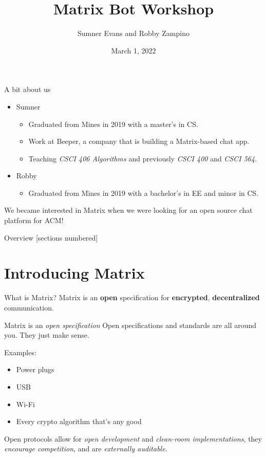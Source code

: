 \documentclass{acm}
\title{Matrix Bot Workshop}
\author{Sumner Evans and Robby Zampino}
\date{March 1, 2022}
\begin{document}
\begin{frame}{A bit about us}
    \begin{itemize}
        \item Sumner
            \begin{itemize}
                \item Graduated from Mines in 2019 with a master's in CS.
                \item Work at Beeper, a company that is building a Matrix-based
                    chat app.
                \item Teaching \textit{CSCI 406 Algorithms} and previously
                    \textit{CSCI 400} and \textit{CSCI 564}.
            \end{itemize}

        \item Robby
            \begin{itemize}
                \item Graduated from Mines in 2019 with a bachelor's in EE and
                    minor in CS.
            \end{itemize}
    \end{itemize}

    We became interested in Matrix when we were looking for an open source chat
    platform for ACM!
\end{frame}

\begin{frame}{Overview}
    [sections numbered]
    \tableofcontents[hideallsubsections]
\end{frame}

\section{Introducing Matrix}

\begin{frame}{What is Matrix?}
    Matrix is an \textbf{open} specification for \textbf{encrypted},
    \textbf{decentralized} communication.
\end{frame}

\begin{frame}{Matrix is an \textit{open specification}}
    Open specifications and standards are all around you. They just make
    sense\texttrademark.

    Examples:\pause
    \begin{itemize}
        \item Power plugs
        \item USB
        \item Wi-Fi
        \item Every crypto algorithm that's any good
    \end{itemize}
    \pause

    Open protocols allow for \textit{open development} and  \textit{clean-room
    implementations}, they \textit{encourage competition}, and are
    \textit{externally auditable}.
\end{frame}
\end{document}
